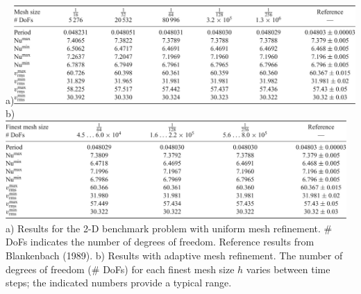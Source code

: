 \begin{center}
a)\includegraphics[width=13cm]{images/benchmark_blbc89/krhb12a}
b)\includegraphics[width=13cm]{images/benchmark_blbc89/krhb12b}\\
{\captionfont 
a) Results for the 2-D benchmark problem with uniform mesh refinement. 
\# DoFs indicates the number of degrees of freedom.
Reference results from Blankenbach \etal (1989).
b) Results with adaptive mesh refinement. The number of degrees of freedom (\# DoFs) for
each finest mesh size $h$ varies between time steps; 
the indicated numbers provide a typical range.}
\end{center}




